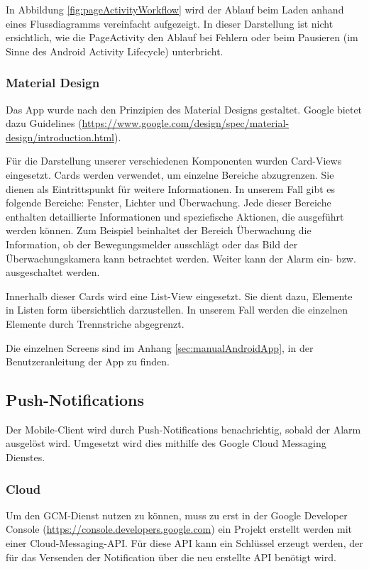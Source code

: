 In Abbildung \ref{fig:pageActivityWorkflow} wird der Ablauf beim Laden anhand eines Flussdiagramms vereinfacht aufgezeigt. In dieser Darstellung ist nicht ersichtlich, wie die PageActivity den Ablauf bei Fehlern oder beim Pausieren (im Sinne des Android Activity Lifecycle) unterbricht.

\subsubsection{Material Design}
Das App wurde nach den Prinzipien des Material Designs gestaltet. Google bietet dazu Guidelines (\url{https://www.google.com/design/spec/material-design/introduction.html}).

Für die Darstellung unserer verschiedenen Komponenten wurden Card-Views eingesetzt. Cards werden verwendet, um einzelne Bereiche abzugrenzen. Sie dienen als Eintrittspunkt für weitere Informationen. In unserem Fall gibt es folgende Bereiche: Fenster, Lichter und Überwachung. Jede dieser Bereiche enthalten detaillierte Informationen und speziefische Aktionen, die ausgeführt werden können. Zum Beispiel beinhaltet der Bereich Überwachung die Information, ob der Bewegungsmelder ausschlägt oder das Bild der Überwachungskamera kann betrachtet werden. Weiter kann der Alarm ein- bzw. ausgeschaltet werden.

Innerhalb dieser Cards wird eine List-View eingesetzt. Sie dient dazu, Elemente in Listen form übersichtlich darzustellen. In unserem Fall werden die einzelnen Elemente durch Trennstriche abgegrenzt.

Die einzelnen Screens sind im Anhang \ref{sec:manualAndroidApp}, in der Benutzeranleitung der App zu finden.

\subsection{Push-Notifications}
\label{sec:notificationRealization}
Der Mobile-Client wird durch Push-Notifications benachrichtig, sobald der Alarm ausgelöst wird. Umgesetzt wird dies mithilfe des Google Cloud Messaging Dienstes.

\subsubsection{Cloud}
Um den GCM-Dienst nutzen zu können, muss zu erst in der Google Developer Console (\url{https://console.developers.google.com}) ein Projekt erstellt werden mit einer Cloud-Messaging-API. Für diese API kann ein Schlüssel erzeugt werden, der für das Versenden der Notification über die neu erstellte API benötigt wird.

